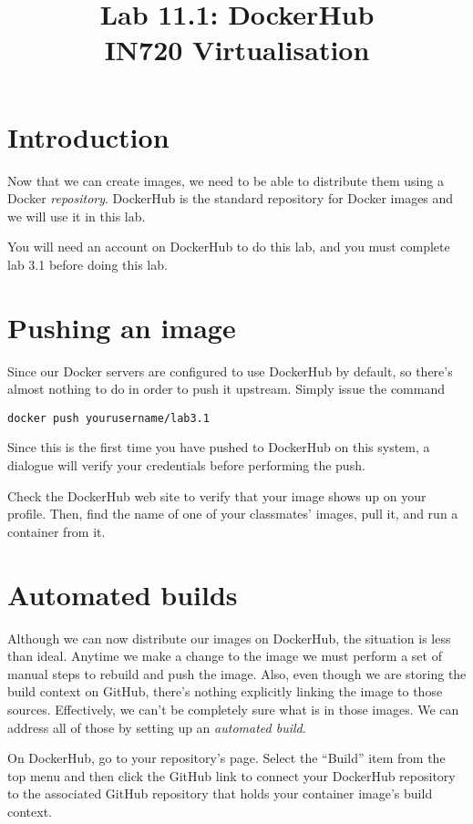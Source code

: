 \documentclass{article}
\begin{document}
\title{Lab 11.1: DockerHub\\ IN720 Virtualisation}
\date{}
\maketitle

\section*{Introduction}
Now that we can create images, we need to be able to distribute them using a Docker \emph{repository}.  DockerHub is the standard repository for Docker images and we will use it in this lab.

You will need an account on DockerHub to do this lab, and you must complete lab 3.1 before doing this lab.

\section{Pushing an image}
Since our Docker servers are configured to use DockerHub by default, so there's almost nothing to do in order to push it upstream.  Simply issue the command

\texttt{docker push yourusername/lab3.1}

Since this is the first time you have pushed to DockerHub on this system, a dialogue will verify your credentials before performing the push.

Check the DockerHub web site to verify that your image shows up on your profile.  Then, find the name of one of your classmates' images, pull it, and run a container from it.

\section{Automated builds}
Although we can now distribute our images on DockerHub, the situation is less than ideal.  Anytime we make a change to the image we must perform a set of manual steps to rebuild and push the image.  Also, even though we are storing the build context on GitHub, there's nothing explicitly linking the image to those sources. Effectively, we can't be completely sure what is in those images. We can address all of those by setting up an \emph{automated build}.

On DockerHub, go to your repository's page. Select the ``Build'' item from the top menu and then click the GitHub link to connect your DockerHub repository to the associated GitHub repository that holds your container image's build context.
\end{document}
